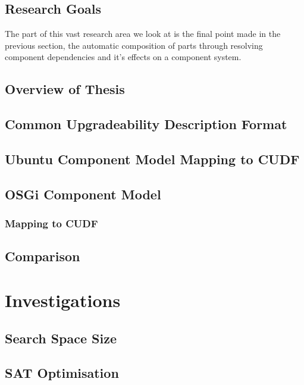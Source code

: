 \documentclass{report}
\begin{document}
\section{Research Goals}
{}The part of this vast research area we look at is the final point made in the previous section, 
{}the automatic composition of parts through resolving component dependencies and it's effects on a component system.


\section{Overview of Thesis}









\section{Common Upgradeability Description Format}

\section{Ubuntu Component Model Mapping to CUDF}

\section{OSGi Component Model}
\subsection{Mapping to CUDF}

\section{Comparison}

\chapter{Investigations}

\section{Search Space Size}

\section{SAT Optimisation}
\end{document}
